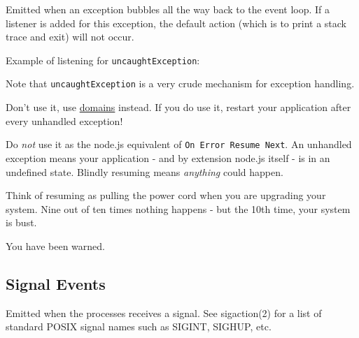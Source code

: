 Emitted when an exception bubbles all the way back to the event loop. If
a listener is added for this exception, the default action (which is to
print a stack trace and exit) will not occur.

Example of listening for \texttt{uncaughtException}:

\begin{Shaded}
\begin{Highlighting}[]
\NormalTok{(}\NormalTok{, }
  \NormalTok{(} 
\NormalTok{\});}

\NormalTok{(}\NormalTok{() \{}
  \NormalTok{(}\NormalTok{);}
\NormalTok{\}, }\NormalTok{);}

\NormalTok{();}
\NormalTok{(}\NormalTok{);}
\end{Highlighting}
\end{Shaded}

Note that \texttt{uncaughtException} is a very crude mechanism for
exception handling.

Don't use it, use \href{domain.html}{domains} instead. If you do use it,
restart your application after every unhandled exception!

Do \emph{not} use it as the node.js equivalent of
\texttt{On\ Error\ Resume\ Next}. An unhandled exception means your
application - and by extension node.js itself - is in an undefined
state. Blindly resuming means \emph{anything} could happen.

Think of resuming as pulling the power cord when you are upgrading your
system. Nine out of ten times nothing happens - but the 10th time, your
system is bust.

You have been warned.

\subsection{Signal Events}\label{signal-events}

Emitted when the processes receives a signal. See sigaction(2) for a
list of standard POSIX signal names such as SIGINT, SIGHUP, etc.

